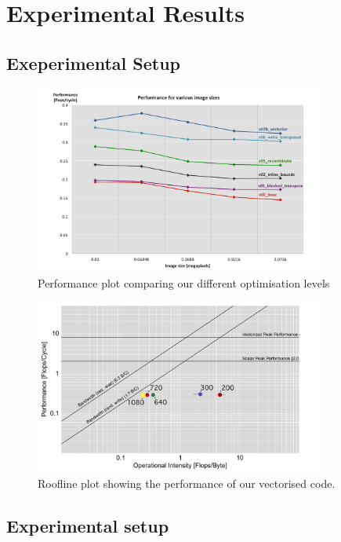 \section{Experimental Results}\label{sec:exp}
\subsection{Exeperimental Setup}\label{sec:exp_setup8}
\begin{figure}
    \centering
    \includegraphics[width=0.85\textwidth]{figures/performance}
    \caption{Performance plot comparing our different optimisation levels}
\end{figure}

\begin{figure} 
    \centering
    \includegraphics[width=0.85\textwidth]{figures/roofline}
    \caption{Roofline plot showing the performance of our vectorised code.}
\end{figure}


\subsection{Experimental setup}

